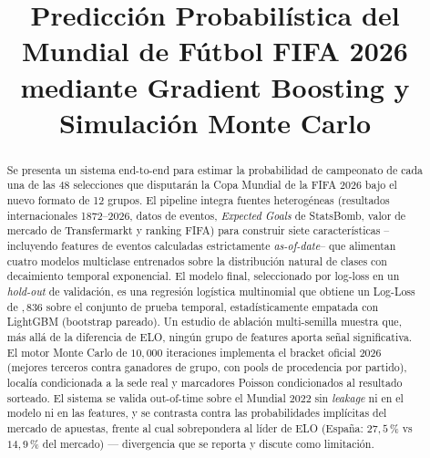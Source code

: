 \documentclass[conference]{IEEEtran}
\begin{document}
\title{Predicci\'on Probabil\'istica del Mundial de F\'utbol FIFA 2026
  mediante Gradient Boosting y Simulaci\'on Monte Carlo}

\author{
}

\maketitle

\begin{abstract}
  Se presenta un sistema end-to-end para estimar la probabilidad de
  campeonato de cada una de las 48 selecciones que disputar\'an la Copa
  Mundial de la FIFA 2026 bajo el nuevo formato de 12 grupos. El pipeline
  integra fuentes heterog\'eneas (resultados internacionales 1872--2026,
  datos de eventos, \emph{Expected Goals} de StatsBomb, valor de mercado de
  Transfermarkt y ranking FIFA) para construir siete caracter\'isticas
  --incluyendo features de eventos calculadas estrictamente
  \emph{as-of-date}-- que alimentan cuatro modelos multiclase entrenados
  sobre la distribuci\'on natural de clases con decaimiento temporal
  exponencial. El modelo final, seleccionado por log-loss en un
  \emph{hold-out} de validaci\'on, es una regresi\'on log\'istica multinomial
  que obtiene un Log-Loss de ${,}836$ sobre el conjunto de prueba temporal,
  estad\'isticamente empatada con LightGBM (bootstrap pareado). Un estudio
  de ablaci\'on multi-semilla muestra que, m\'as all\'a de la diferencia de
  ELO, ning\'un grupo de features aporta se\~nal significativa. El motor
  Monte Carlo de $10{,}000$ iteraciones implementa el bracket oficial 2026
  (mejores terceros contra ganadores de grupo, con pools de procedencia por
  partido), localía condicionada a la sede real y marcadores Poisson
  condicionados al resultado sorteado. El sistema se valida out-of-time
  sobre el Mundial 2022 sin \emph{leakage} ni en el modelo ni en las
  features, y se contrasta contra las probabilidades impl\'icitas del
  mercado de apuestas, frente al cual sobrepondera al l\'ider de ELO
  (Espa\~na: $27{,}5$\,\% vs $14{,}9$\,\% del mercado) --- divergencia que
  se reporta y discute como limitaci\'on.
\end{abstract}
\end{document}
